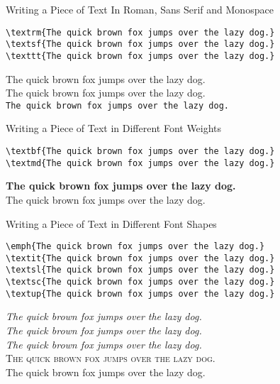 \documentclass[a4paper,oneside,11pt]{article}
\begin{document}
\vspace{-1.0em}

\begin{titled-frame}
{\textsf{Writing a Piece of Text In Roman, Sans Serif and Monospace}}
\vspace{-1em}
\begin{verbatim}
\textrm{The quick brown fox jumps over the lazy dog.}
\textsf{The quick brown fox jumps over the lazy dog.}
\texttt{The quick brown fox jumps over the lazy dog.}
\end{verbatim}
\textrm{The quick brown fox jumps over the lazy dog.}\\
\textsf{The quick brown fox jumps over the lazy dog.}\\
\texttt{The quick brown fox jumps over the lazy dog.}
\end{titled-frame}

\vspace{-1.0em}

\begin{titled-frame}
{\textsf{Writing a Piece of Text in Different Font Weights}}
\vspace{-1em}
\begin{verbatim}
\textbf{The quick brown fox jumps over the lazy dog.}
\textmd{The quick brown fox jumps over the lazy dog.}
\end{verbatim}
\textbf{The quick brown fox jumps over the lazy dog.}\\
\textmd{The quick brown fox jumps over the lazy dog.}
\end{titled-frame}

\vspace{-1.0em}

\begin{titled-frame}
{\textsf{Writing a Piece of Text in Different Font Shapes}}
\vspace{-1em}
\begin{verbatim}
\emph{The quick brown fox jumps over the lazy dog.}
\textit{The quick brown fox jumps over the lazy dog.}
\textsl{The quick brown fox jumps over the lazy dog.}
\textsc{The quick brown fox jumps over the lazy dog.}
\textup{The quick brown fox jumps over the lazy dog.}
\end{verbatim}
\emph{The quick brown fox jumps over the lazy dog.}\\
\textit{The quick brown fox jumps over the lazy dog.}\\
\textsl{The quick brown fox jumps over the lazy dog.}\\
\textsc{The quick brown fox jumps over the lazy dog.}\\
\textup{The quick brown fox jumps over the lazy dog.}
\end{titled-frame}
\end{document}
